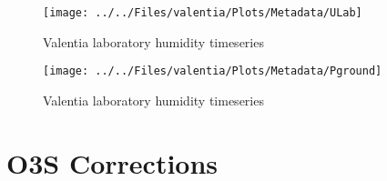 \documentclass{article}
\begin{document}
               \begin{figure}
        \centering
\texttt{[image: ../../Files/valentia/Plots/Metadata/ULab]}
    \caption{Valentia laboratory humidity timeseries}
            \label{fig:ULab}
    \end{figure}

               \begin{figure}
        \centering
\texttt{[image: ../../Files/valentia/Plots/Metadata/Pground]}
    \caption{Valentia laboratory humidity timeseries}
            \label{fig:PLab}
    \end{figure}

\section{O3S Corrections}
\label{sec:v05}
\end{document}
